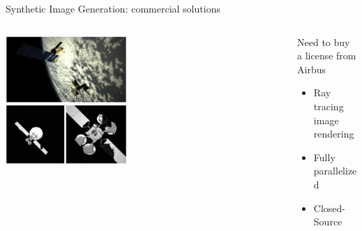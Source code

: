 \documentclass[10pt]{beamer}
\begin{document}
\begin{frame}{Synthetic Image Generation: commercial solutions}
\begin{overlayarea}{\textwidth}{0.8\textheight}
  \begin{columns}[T,onlytextwidth]
  \hspace{0.6cm}  
    \begin{column}{0.5\textwidth}
         \includegraphics[width=0.44\textwidth]{gfx/surrender.eps}
    \end{column}
    \hspace{-1.5cm}
    \begin{column}{0.5\textwidth}

    \smallskip
    
    Need to buy a license from Airbus
  
    \smallskip
 
    \begin{itemize}[label=$\bullet$]
      \item Ray tracing image rendering
      \item Fully parallelized
      \item Closed-Source
    \end{itemize}
    \end{column}
  \end{columns}
\end{overlayarea}
\end{frame}
\end{document}
